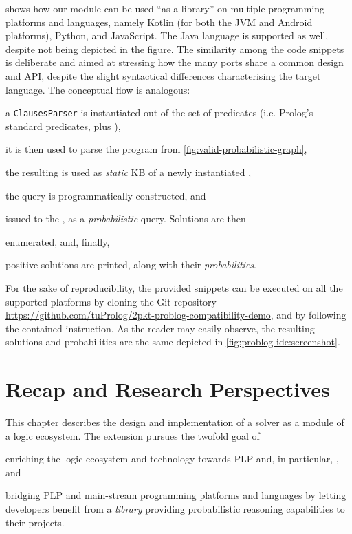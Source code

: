 \documentclass[12pt,a4paper,openright,twoside]{book}
\begin{document}
 shows how our \problog{} module can be used ``as a library'' on multiple programming platforms and languages, namely Kotlin (for both the JVM and Android platforms), Python, and JavaScript.
%
The Java language is supported as well, despite not being depicted in the figure.
%
The similarity among the code snippets is deliberate and aimed at stressing how the many \twopkt{} ports share a common design and API, despite the slight syntactical differences characterising the target language.
%
The conceptual flow is analogous:
%
\begin{inlinelist}
\item a \texttt{ClausesParser} is instantiated out of the set of \problog{} predicates (i.e. Prolog's standard predicates, plus ),
\item it is then used to parse the \problog{} program from \cref{fig:valid-probabilistic-graph},
\item the resulting  is used as \emph{static} KB of a newly instantiated \problog{} ,
\item the query  is programmatically constructed, and
\item issued to the , as a \emph{probabilistic} query.
%
Solutions are then
\item enumerated, and, finally,
\item positive solutions are printed, along with their \emph{probabilities}.
\end{inlinelist}
%
For the sake of reproducibility, the provided snippets can be executed on all the supported platforms by cloning the Git repository \url{https://github.com/tuProlog/2pkt-problog-compatibility-demo}, and by following the contained instruction.
%
As the reader may easily observe, the resulting solutions and probabilities are the same depicted in \cref{fig:problog-ide:screenshot}.

\section{Recap and Research Perspectives}

This chapter describes the design and implementation of a \problog{} solver as a module of a logic ecosystem.
%
The extension pursues the twofold goal of
%
\begin{inlinelist}
\item enriching the \twopkt{} logic ecosystem and technology towards PLP and, in particular, \problog{}, and
\item bridging PLP and main-stream programming platforms and languages by letting developers benefit from a \emph{library} providing probabilistic reasoning capabilities to their projects.
\end{inlinelist}
\end{document}
